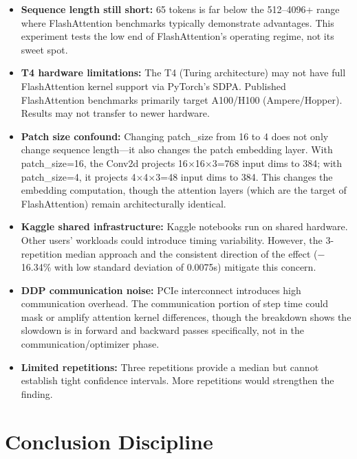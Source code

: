\documentclass[12pt, a4paper]{article}
\begin{document}
\begin{itemize}
    \item \textbf{Sequence length still short:} 65 tokens is far below the 512--4096+ range where FlashAttention benchmarks typically demonstrate advantages. This experiment tests the low end of FlashAttention's operating regime, not its sweet spot.

    \item \textbf{T4 hardware limitations:} The T4 (Turing architecture) may not have full FlashAttention kernel support via PyTorch's SDPA. Published FlashAttention benchmarks primarily target A100/H100 (Ampere/Hopper). Results may not transfer to newer hardware.

    \item \textbf{Patch size confound:} Changing patch\_size from 16 to 4 does not only change sequence length---it also changes the patch embedding layer. With patch\_size=16, the Conv2d projects 16$\times$16$\times$3=768 input dims to 384; with patch\_size=4, it projects 4$\times$4$\times$3=48 input dims to 384. This changes the embedding computation, though the attention layers (which are the target of FlashAttention) remain architecturally identical.

    \item \textbf{Kaggle shared infrastructure:} Kaggle notebooks run on shared hardware. Other users' workloads could introduce timing variability. However, the 3-repetition median approach and the consistent direction of the effect ($-$16.34\% with low standard deviation of 0.0075s) mitigate this concern.

    \item \textbf{DDP communication noise:} PCIe interconnect introduces high communication overhead. The communication portion of step time could mask or amplify attention kernel differences, though the breakdown shows the slowdown is in forward and backward passes specifically, not in the communication/optimizer phase.

    \item \textbf{Limited repetitions:} Three repetitions provide a median but cannot establish tight confidence intervals. More repetitions would strengthen the finding.
\end{itemize}

\section{Conclusion Discipline}
\end{document}
